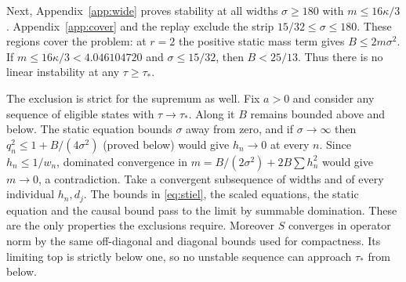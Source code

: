 \documentclass[11pt]{article}
\begin{document}
Next, Appendix~\ref{app:wide} proves stability at all widths $\sigma\ge180$ with $m\le16\kappa/3$. Appendix~\ref{app:cover} and the replay exclude the strip $15/32\le\sigma\le180$. These regions cover the problem: at $r=2$ the positive static mass term gives $B\le2m\sigma^2$. If $m\le16\kappa/3<4.046104720$ and $\sigma\le15/32$, then $B<25/13$. Thus there is no linear instability at any $\tau\ge\tau_*$.

The exclusion is strict for the supremum as well. Fix $a>0$ and consider any sequence of eligible states with $\tau\to\tau_*$. Along it $B$ remains bounded above and below. The static equation bounds $\sigma$ away from zero, and if $\sigma\to\infty$ then $q_n^2\le1+B/(4\sigma^2)$ (proved below) would give $h_n\to0$ at every $n$. Since $h_n\le1/w_n$, dominated convergence in $m=B/(2\sigma^2)+2B\sum h_n^2$ would give $m\to0$, a contradiction. Take a convergent subsequence of widths and of every individual $h_n,d_j$. The bounds in \eqref{eq:stiel}, the scaled equations, the static equation and the causal bound pass to the limit by summable domination. These are the only properties the exclusions require. Moreover $S$ converges in operator norm by the same off-diagonal and diagonal bounds used for compactness. Its limiting top is strictly below one, so no unstable sequence can approach $\tau_*$ from below.
\end{document}
